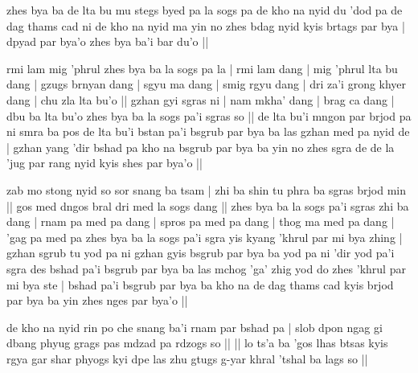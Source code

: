 \documentclass[11pt,twoside]{article}\makeatletter
\begin{document}
\label{TV18.5}zhes bya ba de lta bu mu stegs byed pa la sogs pa de kho na nyid du 'dod pa de dag thams cad ni de kho na nyid ma yin no zhes bdag nyid kyis brtags par bya | dpyad par bya'o zhes bya ba'i bar du'o || 
\par
\label{TV19}rmi lam mig 'phrul zhes bya ba la sogs pa la | rmi lam dang | mig 'phrul lta bu dang | gzugs brnyan dang | sgyu ma dang | smig rgyu dang | dri za'i grong khyer dang | chu zla lta bu'o || gzhan gyi sgras ni | nam mkha' dang | brag ca dang | dbu ba lta bu'o zhes bya ba la sogs pa'i sgras so || de lta bu'i mngon par brjod pa ni smra ba pos de lta bu'i bstan pa'i bsgrub par bya ba las gzhan med pa nyid de | gzhan yang 'dir bshad pa kho na bsgrub par bya ba yin no zhes sgra de de la 'jug par rang nyid kyis shes par bya'o || 
\par
\label{TV20}zab mo stong nyid so sor snang ba tsam | zhi ba shin tu phra ba sgras brjod min || gos med dngos bral dri med la sogs dang || zhes bya ba la sogs pa'i sgras zhi ba dang | rnam pa med pa dang | spros pa med pa dang | thog ma med pa dang | 'gag pa med pa zhes bya ba la sogs pa'i sgra yis kyang 'khrul par mi bya zhing | gzhan  sgrub tu yod pa ni gzhan gyis bsgrub par bya ba yod pa ni 'dir yod pa'i sgra des bshad pa'i bsgrub par bya ba las mchog 'ga' zhig yod do zhes 'khrul par mi bya ste | bshad pa'i bsgrub par bya ba kho na de dag thams cad kyis brjod par bya ba yin zhes nges par bya'o ||
\par
\label{colophon}de kho na nyid rin po che snang ba'i rnam par bshad pa | slob dpon ngag gi dbang phyug grags pas mdzad pa rdzogs so || || lo ts'a ba 'gos lhas btsas kyis rgya gar shar phyogs kyi dpe las zhu gtugs g-yar khral 'tshal ba lags so || 
\end{document}
